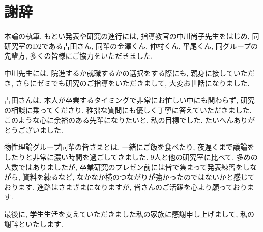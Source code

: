 \chapter*{謝辞}

本論の執筆, もとい発表や研究の進行には, 指導教官の中川尚子先生をはじめ, 同研究室のD2である吉田さん, 同輩の金澤くん, 仲村くん, 平尾くん, 同グループの先輩方, 多くの皆様にご協力をいただきました. 

中川先生には, 院進するか就職するかの選択をする際にも, 親身に接していただき, さらにゼミでも研究のご指導をいただきまして, 大変お世話になりました. 

吉田さんは, 本人が卒業するタイミングで非常にお忙しい中にも関わらず, 研究の相談に乗ってくださり, 稚拙な質問にも優しく丁寧に答えていただきました. このような心に余裕のある先輩になりたいと, 私の目標でした. たいへんありがとうございました. 

物性理論グループ同輩の皆さまとは, 一緒にご飯を食べたり, 夜遅くまで議論をしたりと非常に濃い時間を過ごしてきました. 9人と他の研究室に比べて, 多めの人数ではありましたが, 卒業研究のプレゼン前には皆で集まって発表練習をしながら, 資料を練るなど, なかなか横のつながりが強かったのではないかと感じております. 進路はさまざまになりますが, 皆さんのご活躍を心より願っております.

最後に, 学生生活を支えていただきました私の家族に感謝申し上げまして, 私の謝辞といたします.

